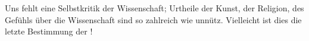 Uns fehlt eine Selbstkritik der Wissenschaft; Urtheile der Kunst, der Religion, des Gefühls über die Wissenschaft sind so zahlreich wie unnütz. Vielleicht ist dies die letzte Bestimmung der !
\par

